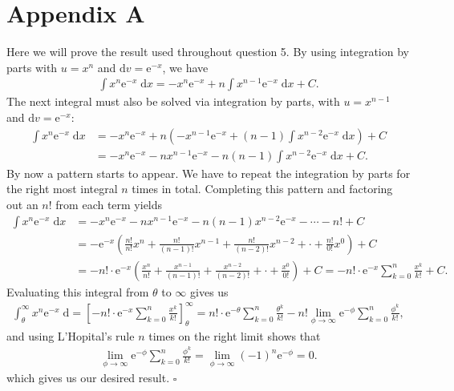 \documentclass[10pt]{article}
\begin{document}
\section{Appendix A} \noindent
Here we will prove the result used throughout question 5. By using integration by parts with \(u = x^n\) and \(\mathrm{d}v = \mathrm{e}^{-x}\), we have 
\begin{align*}
    \int x^n \mathrm{e}^{-x} \;\mathrm{d}x = -x^n \mathrm{e}^{-x} + n \int x^{n-1} \mathrm{e}^{-x} \;\mathrm{d}x + C.
\end{align*}
The next integral must also be solved via integration by parts, with \(u = x^{n-1}\) and \(\mathrm{d}v = \mathrm{e}^{-x}\):
\begin{align*}
    \int x^n \mathrm{e}^{-x} \;\mathrm{d}x &= -x^n \mathrm{e}^{-x} + n \left( -x^{n-1} \mathrm{e}^{-x} + (n-1) \int x^{n-2} \mathrm{e}^{-x} \;\mathrm{d}x  \right) + C \\
    &= -x^n \mathrm{e}^{-x} -nx^{n-1} \mathrm{e}^{-x} - n(n-1) \int x^{n-2} \mathrm{e}^{-x} \;\mathrm{d}x + C.
\end{align*}
By now a pattern starts to appear. We have to repeat the integration by parts for the right most integral \(n\) times in total. 
Completing this pattern and factoring out an \(n!\) from each term yields
\begin{align*}
    \int x^n \mathrm{e}^{-x} \;\mathrm{d}x &= -x^n \mathrm{e}^{-x} - nx^{n-1}\mathrm{e}^{-x} - n(n-1)x^{n-2}\mathrm{e}^{-x} - \cdots - n! + C\\
    &= -\mathrm{e}^{-x} \left( \frac{n!}{n!}x^{n} + \frac{n!}{(n-1)!}x^{n-1} + \frac{n!}{(n-2)!}x^{n-2} + \cdot + \frac{n!}{0!}x^0 \right) + C\\
    &= -n! \cdot \mathrm{e}^{-x} \left( \frac{x^n}{n!} + \frac{x^{n-1}}{(n-1)!} + \frac{x^{n-2}}{(n-2)!} + \cdot + \frac{x^0}{0!} \right) + C
    = -n! \cdot \mathrm{e}^{-x} \sum_{k=0}^n \frac{x^k}{k!} + C.
\end{align*}
Evaluating this integral from \(\theta\) to \(\infty\) gives us 
\begin{align*}
    \int_{\theta}^{\infty} x^n \mathrm{e}^{-x} \;\mathrm{d} 
    = \left[ -n! \cdot \mathrm{e}^{-x} \sum_{k=0}^n \frac{x^k}{k!} \right]_{\theta}^{\infty}
    = n! \cdot \mathrm{e}^{-\theta} \sum_{k=0}^n \frac{\theta^k}{k!} - n! \lim_{\phi \to \infty} \mathrm{e}^{-\phi} \sum_{k=0}^n \frac{\phi^k}{k!},
\end{align*}
and using L'Hopital's rule \(n\) times on the right limit shows that 
\begin{align*}
    \lim_{\phi \to \infty} \mathrm{e}^{-\phi} \sum_{k=0}^n \frac{\phi^k}{k!} = \lim_{\phi \to \infty} (-1)^n \mathrm{e}^{-\phi} = 0.
\end{align*}
which gives us our desired result. \hfill \(\square\)
\end{document}

